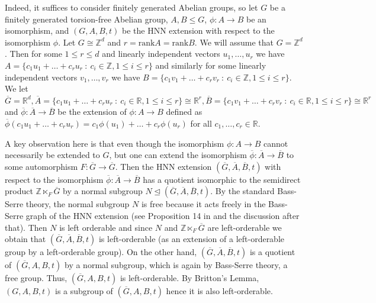 \documentclass[12pt]{amsart}
\theoremstyle{definition}
\newcommand{\blackboard}[1]{\ensuremath{\mathbb{#1}}}
\newcommand{\R}{\blackboard{R}}
\begin{document}
   
   Indeed, it suffices to consider finitely generated Abelian groups, so let $G$ be a finitely generated torsion-free Abelian group, $A, B\leq G$, $\phi :A\to B$ be an isomorphism, and $(G, A, B, t)$ be the HNN extension with respect to the isomorphism $\phi $. Let $G \cong \mathbb{Z}^d$ and $r = \mathrm{rank}A = \mathrm{rank}B$. We will assume that $G = \mathbb{Z}^d$. Then for some $1\leq r\leq d$ and linearly independent vectors $u_1, \dots , u_r$ we have $A = \{c_1u_1+\dots +c_ru_r \ : \ c_i\in \mathbb{Z}, 1\leq i\leq r\}$ and similarly for some linearly independent vectors $v_1, \dots , v_r$ we have $B = \{c_1v_1+\dots +c_rv_r \ : \ c_i\in \mathbb{Z}, 1\leq i\leq r\}$. We let $\overline {G} = \mathbb{R}^d, \overline{A} = \{c_1u_1+\dots +c_ru_r \ : \ c_i\in \mathbb{R}, 1\leq i\leq r\}\cong \R ^r, \overline{B} = \{c_1v_1+\dots +c_rv_r \ : \ c_i\in \mathbb{R}, 1\leq i\leq r\}\cong \R ^r$ and $\overline {\phi }:\overline{A}\to \overline{B}$ be the extension of $\phi :A\to B$ defined as $\overline{\phi }(c_1u_1+\dots +c_ru_r) = c_1\phi (u_1)+\dots + c_r\phi (u_r)$ for all $c_1, \dots , c_r\in \mathbb{R}$.     
  
  \medskip
  
   A key observation here is that even though the isomorphism $\phi :A\to B$ cannot necessarily be extended to $G$, but one can extend the isomorphism $\overline {\phi }:\overline{A}\to \overline{B}$ to some automorphism $F:\overline{G}\to \overline{G}$. Then the HNN extension $(\overline{G}, \overline{A}, \overline{B}, t)$ with respect to the isomorphism $\overline {\phi }:\overline{A}\to \overline{B}$ has a quotient isomorphic to the semidirect product $\mathbb{Z}\ltimes _{F}\overline{G}$ by a normal subgroup $N\trianglelefteq (\overline{G}, \overline{A}, \overline{B}, t)$. By the standard Bass-Serre theory, the normal subgroup $N$ is free because it acts freely in the Bass-Serre graph of the HNN extension (see Proposition 14 in \cite{S} and the discussion after that). Then $N$ is left orderable and since  $N$ and $\mathbb{Z}\ltimes _{F}\overline{G}$ are left-orderable we obtain that $(\overline{G}, \overline{A}, \overline{B}, t)$ is left-orderable (as an extension of a left-orderable group by a left-orderable group). On the other hand, $(\overline{G}, \overline{A}, \overline{B}, t)$ is a quotient of $(\overline{G}, A, B, t)$ by a normal subgroup, which is again by Bass-Serre theory, a free group. Thus, $(\overline{G}, A, B, t)$ is left-orderable.  By Britton's Lemma, $(G, A, B, t)$ is a subgroup of $(\overline{G}, A, B, t)$ hence it is also left-orderable.  
   
\end{document}
